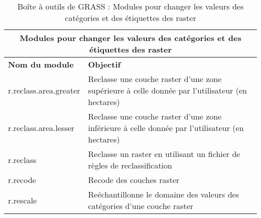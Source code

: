 \begin{table}[ht]
\centering
 \begin{tabular}{|p{4cm}|p{10cm}|}
  \hline \multicolumn{2}{|c|}{\textbf{Modules pour changer les valeurs des catégories et des étiquettes des raster}} \\  
  \hline \textbf{Nom du module} & \textbf{Objectif} \\
  \hline r.reclass.area.greater & Reclasse une couche raster d'une zone supérieure à celle donnée par l'utilisateur (en hectares) \\
  \hline r.reclass.area.lesser & Reclasse une couche raster d'une zone inférieure à celle donnée par l'utilisateur (en hectares) \\
  \hline r.reclass & Reclasse un raster en utilisant un fichier de règles de reclassification \\
  \hline r.recode & Recode des couches raster \\
  \hline r.rescale & Reéchantillonne le domaine des valeurs des catégories d'une couche raster \\
\hline
\end{tabular}
\caption{Boîte à outils de GRASS : Modules pour changer les valeurs des catégories et des étiquettes des raster}
\end{table}

